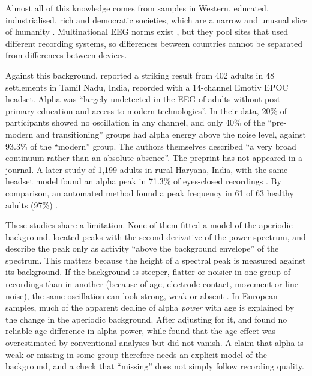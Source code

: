 \documentclass[11pt,a4paper]{article}
\begin{document}
Almost all of this knowledge comes from samples in Western, educated, industrialised, rich
and democratic societies, which are a narrow and unusual slice of humanity
\citep{henrich2010}. Multinational EEG norms exist \citep{li2022}, but they pool sites that
used different recording systems, so differences between countries cannot be separated
from differences between devices.

Against this background, \citet{parameshwaran2017} reported a striking result from 402
adults in 48 settlements in Tamil Nadu, India, recorded with a 14-channel Emotiv EPOC
headset. Alpha was ``largely undetected in the EEG of adults without post-primary
education and access to modern technologies''. In their data, 20\% of participants showed
no oscillation in any channel, and only 40\% of the ``pre-modern and transitioning''
groups had alpha energy above the noise level, against 93.3\% of the ``modern'' group. The
authors themselves described ``a very broad continuum rather than an absolute absence''.
The preprint has not appeared in a journal. A later study of 1,199 adults in rural
Haryana, India, with the same headset model found an alpha peak in 71.3\% of eyes-closed
recordings \citep{bhavnani2022}. By comparison, an automated method found a peak
frequency in 61 of 63 healthy adults (97\%)
\citep{corcoran2018}.

These studies share a limitation. None of them fitted a model of the aperiodic background.
\citet{parameshwaran2017} located peaks with the second derivative of the power spectrum,
and \citet{bhavnani2022} describe the peak only as activity ``above the background
envelope'' of the spectrum. This matters because the height of a spectral peak is measured
against its background. If the background is steeper, flatter or noisier in one group of
recordings than in another (because of age, electrode contact, movement or line noise),
the same oscillation can look strong, weak or absent
\citep{donoghue2020,donoghue2022,gerster2022}. In European samples, much of the apparent
decline of alpha \emph{power} with age is explained by the change in the aperiodic
background. After adjusting for it, \citet{merkin2023} and \citet{cesnaite2023} found no
reliable age difference in alpha power, while \citet{trondle2023} found that the age
effect was overestimated by conventional analyses but did not vanish. A claim that alpha
is weak or missing in some group therefore needs an explicit model of the background, and
a check that ``missing'' does not simply follow recording quality.
\end{document}
